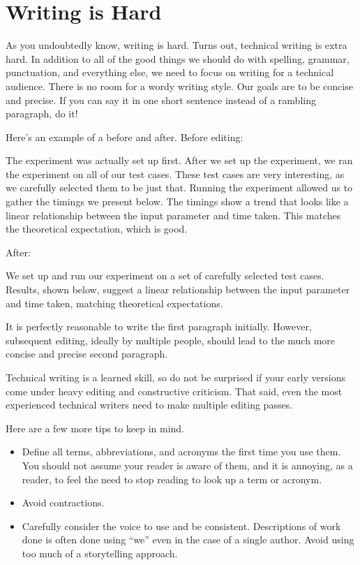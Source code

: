 \documentclass[12pt]{article}
\begin{document}
\section{Writing is Hard}
\label{sec:writing}

As you undoubtedly know, writing is hard.  Turns out, technical
writing is extra hard.  In addition to all of the good things we
should do with spelling, grammar, punctuation, and everything else, we
need to focus on writing for a technical audience.  There is no room
for a wordy writing style.  Our goals are to be concise and precise.
If you can say it in one short sentence instead of a rambling
paragraph, do it!

Here's an example of a before and after.  Before editing:

The experiment was actually set up first.  After we set up the
experiment, we ran the experiment on all of our test cases.  These
test cases are very interesting, as we carefully selected them to be
just that.  Running the experiment allowed us to gather the timings we
present below.  The timings show a trend that looks like a linear
relationship between the input parameter and time taken.  This matches
the theoretical expectation, which is good.

After:

We set up and run our experiment on a set of carefully selected test
cases.  Results, shown below, suggest a linear relationship between
the input parameter and time taken, matching theoretical expectations.

It is perfectly reasonable to write the first paragraph initially.
However, subsequent editing, ideally by multiple people, should lead
to the much more concise and precise second paragraph.

Technical writing is a learned skill, so do not be surprised if your
early versions come under heavy editing and constructive criticism.
That said, even the most experienced technical writers need to make
multiple editing passes.

Here are a few more tips to keep in mind.

\begin{itemize}

\item Define all terms, abbreviations, and acronyms the first time you
  use them.  You should not assume your reader is aware of them, and
  it is annoying, as a reader, to feel the need to stop reading to
  look up a term or acronym.

\item Avoid contractions.

\item Carefully consider the voice to use and be consistent.
  Descriptions of work done is often done using ``we'' even in the
  case of a single author.  Avoid using too much of a storytelling
  approach.

\end{itemize}
\end{document}
